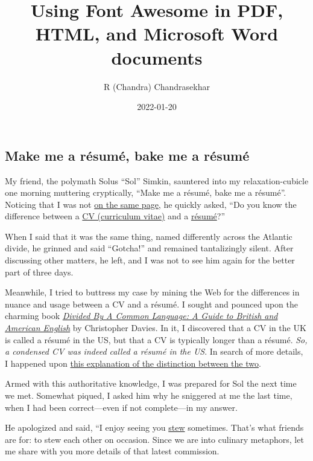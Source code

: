\documentclass[
  british,
  a4paper,
  rgb,
  dvipsnames,
  svgnames,
  hyphens]{article}
\title{Using Font Awesome in PDF, HTML, and Microsoft Word documents}
\author{R (Chandra) Chandrasekhar}
\date{2022-01-20}
\begin{document}
\maketitle

\setlength{\parindent}{0pt} %
\thispagestyle{empty}


\hypertarget{make-me-a-ruxe9sumuxe9-bake-me-a-ruxe9sumuxe9}{%
\subsection{Make me a résumé, bake me a
résumé}\label{make-me-a-ruxe9sumuxe9-bake-me-a-ruxe9sumuxe9}}

My friend, the polymath Solus ``Sol'' Simkin, sauntered into my
relaxation-cubicle one morning muttering cryptically, ``Make me a
résumé, bake me a résumé''. Noticing that I was not
\href{https://www.macmillandictionary.com/dictionary/british/be-on-the-same-page}{on
the same page}, he quickly asked, ``Do you know the difference between a
\href{https://www.thefreedictionary.com/curriculum+vitae}{CV (curriculum
vitae)} and a
\href{https://www.collinsdictionary.com/dictionary/english/résumé}{résumé}?''

When I said that it was the same thing, named differently across the
Atlantic divide, he grinned and said ``Gotcha!'' and remained
tantalizingly silent. After discussing other matters, he left, and I was
not to see him again for the better part of three days.

Meanwhile, I tried to buttress my case by mining the Web for the
differences in nuance and usage between a CV and a résumé. I sought and
pounced upon the charming book
\href{https://www.amazon.in/Divided-Common-Language-Christopher-Davies/dp/0618911626/}{\emph{Divided
By A Common Language: A Guide to British and American English}} by
Christopher Davies. In it, I discovered that a CV in the UK is called a
résumé in the US, but that a CV is typically longer than a résumé.
\emph{So, a condensed CV was indeed called a résumé in the US}. In
search of more details, I happened upon
\href{https://icc.ucdavis.edu/materials/résumé/résumécv}{this
explanation of the distinction between the two}.

Armed with this authoritative knowledge, I was prepared for Sol the next
time we met. Somewhat piqued, I asked him why he sniggered at me the
last time, when I had been correct---even if not complete---in my
answer.

He apologized and said, ``I enjoy seeing you
\href{https://www.thefreedictionary.com/stew}{stew} sometimes. That's
what friends are for: to stew each other on occasion. Since we are into
culinary metaphors, let me share with you more details of that latest
commission.
\end{document}
